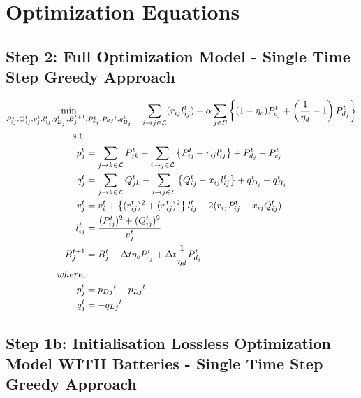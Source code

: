 \section*{Optimization Equations}

\subsection*{Step 2: Full Optimization Model - Single Time Step Greedy Approach}


\begin{gather}
    \min_{P_{ij}^t, Q_{ij}^t, v_{j}^t, l_{ij}^t, q_{D_j}^t, B_{j}^{t+1},
	P_{c_j}^t, P_d{_j}^t, q_{B_j}^t} \quad
	\sum_{\fromto{i, j} \in \mathcal{L}} (r_{ij}l_{ij}^t) + 
	\alpha \sum_{j \in \mathcal{B}} \left\{ (1- \eta_c)P_{c_j}^t + \left(\frac{1}{\eta_d}-1\right) P_{d_j}^t \right\} \\
	\begin{align}
		\text{s.t.} & {}\nonumber \\
		{p_j^t} & = {\sum_{\fromto{j,k} \in \mathcal{L}} P_{jk}^t - \sum_{\fromto{i,j} \in \mathcal{L}}\left\{P_{ij}^t - r_{ij}l_{ij}^t\right\} + P_{d_j}^t - P_{c_j}^t} && \\
		{q_j^t} & = {\sum_{\fromto{j,k} \in \mathcal{L}} Q_{jk}^t - \sum_{\fromto{i,j} \in \mathcal{L}}\left\{Q_{ij}^t - x_{ij}l_{ij}^t\right\} + q_{D_j}^t + q_{B_j}^t} && \\
		{v_j^t} & = {v_{i}^t +  \left\{(r_{ij}^{t})^2 + (x_{ij}^{t})^2\right\}l_{ij}^t - 2(r_{ij}P_{ij}^t + x_{ij}Q_{ij}^t)} && \\
		{l_{ij}^t} & = {\frac{(P_{ij}^{t})^2 + (Q_{ij}^{t})^2}{v_j^t}} \\
		{B_{j}^{t+1}} &= {B_{j}^{t} - \Delta t  \eta_c P_{c_j}^t + \Delta t\frac{1}{\eta_d} P_{d_j}^t} \\
		{where,} & {} \\
		{p_j^t} &= {p_D{_j}^t - p_L{_j}^t} \\
		{q_j^t} &= {-q_L{_j}^t}
	\end{align}
\end{gather}

\subsection*{Step 1b: Initialisation Lossless Optimization Model WITH Batteries - Single Time Step Greedy Approach}


